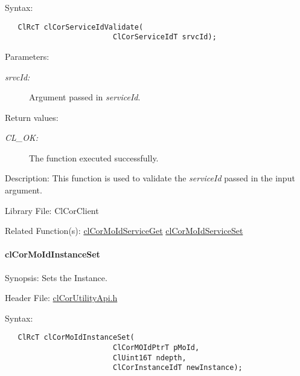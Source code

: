 \begin{Desc}
\item[Syntax:]

\footnotesize\begin{verbatim}   ClRcT clCorServiceIdValidate(
                         ClCorServiceIdT srvcId);
\end{verbatim}
\normalsize
\end{Desc}
\begin{Desc}
\item[Parameters:]
\begin{description}
\item[{\em srvc\-Id:}]Argument passed in {\em service\-Id\/}.\end{description}
\end{Desc}
\begin{Desc}
\item[Return values:]
\begin{description}
\item[{\em CL\_\-OK:}]The function executed successfully.\end{description}
\end{Desc}
\begin{Desc}
\item[Description:]This function is used to validate the {\em service\-Id\/} passed in the input argument.\end{Desc}
\begin{Desc}
\item[Library File:]Cl\-Cor\-Client\end{Desc}
\begin{Desc}
\item[Related Function(s):]\hyperlink{group__group13}{cl\-Cor\-Mo\-Id\-Service\-Get} \hyperlink{group__group13}{cl\-Cor\-Mo\-Id\-Service\-Set} \end{Desc}
\hypertarget{pagecor249}{}\paragraph{cl\-Cor\-Mo\-Id\-Instance\-Set}\label{pagecor249}
\begin{Desc}
\item[Synopsis:]Sets the Instance.\end{Desc}
\begin{Desc}
\item[Header File:]\hyperlink{cl_cor_utility_api_8h}{cl\-Cor\-Utility\-Api.h}\end{Desc}
\begin{Desc}
\item[Syntax:]

\footnotesize\begin{verbatim}   ClRcT clCorMoIdInstanceSet(
                         ClCorMOIdPtrT pMoId,
                         ClUint16T ndepth,
                         ClCorInstanceIdT newInstance);
\end{verbatim}
\normalsize
\end{Desc}
